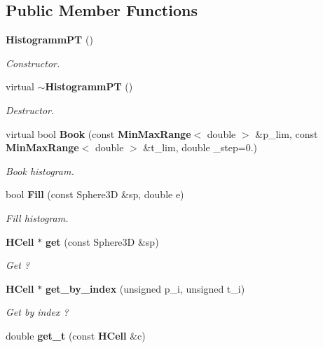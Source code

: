 \subsection*{Public Member Functions}
\begin{DoxyCompactItemize}
\item 
{\bf Histogramm\-P\-T} ()\label{classHistogrammPT_a5eb56dc8f443470d3f2e64261adfcf68}

\begin{DoxyCompactList}\small\item\em Constructor. \end{DoxyCompactList}\item 
virtual {\bf $\sim$\-Histogramm\-P\-T} ()\label{classHistogrammPT_a919d7136a094d78a3160f82796ddc390}

\begin{DoxyCompactList}\small\item\em Destructor. \end{DoxyCompactList}\item 
virtual bool {\bf Book} (const {\bf Min\-Max\-Range}$<$ double $>$ \&p\-\_\-lim, const {\bf Min\-Max\-Range}$<$ double $>$ \&t\-\_\-lim, double \-\_\-step=0.)\label{classHistogrammPT_a9f55c84ff9433921ad550901d77a40ce}

\begin{DoxyCompactList}\small\item\em Book histogram. \end{DoxyCompactList}\item 
bool {\bf Fill} (const Sphere3\-D \&sp, double e)\label{classHistogrammPT_a6f2b6c655ae17e89360f57de164c6e67}

\begin{DoxyCompactList}\small\item\em Fill histogram. \end{DoxyCompactList}\item 
{\bf H\-Cell} $\ast$ {\bf get} (const Sphere3\-D \&sp)\label{classHistogrammPT_afde466a0d65f230d96919bdccce12042}

\begin{DoxyCompactList}\small\item\em Get ? \end{DoxyCompactList}\item 
{\bf H\-Cell} $\ast$ {\bf get\-\_\-by\-\_\-index} (unsigned p\-\_\-i, unsigned t\-\_\-i)\label{classHistogrammPT_ab553651b0281a37e947f6326e72f05bf}

\begin{DoxyCompactList}\small\item\em Get by index ? \end{DoxyCompactList}\item 
double {\bf get\-\_\-t} (const {\bf H\-Cell} \&c)\label{classHistogrammPT_a3649641c88c82a93e12339a21de0379d}


\end{DoxyCompactItemize}
